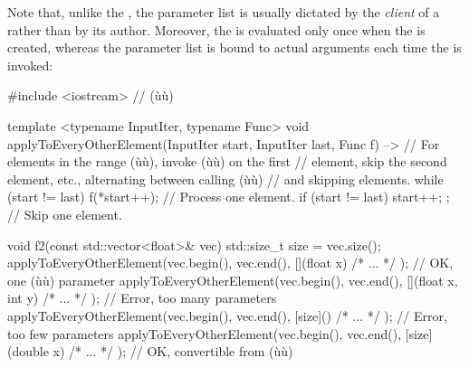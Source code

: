 Note that, unlike the , the parameter list is
usually dictated by the \emph{client} of a 
rather than by its author. Moreover, the  is
evaluated only once when the  is created, whereas the
parameter list is bound to actual arguments each time the  is invoked:

\begin{emcppslisting}
#include <iostream>  // (ù{}ù)

template <typename InputIter, typename Func>
void applyToEveryOtherElement(InputIter start, InputIter last, Func f) -->
    // For elements in the range (ù{\codeincomments{[start, last)}}ù), invoke (ù{}ù) on the first
    // element, skip the second element, etc., alternating between calling (ù{}ù)
    // and skipping elements.
{
    while (start != last)
    {
        f(*start++);                      // Process one element.
        if (start != last) { start++; };  // Skip one element.
    }
}

void f2(const std::vector<float>& vec)
{
    std::size_t size = vec.size();
    applyToEveryOtherElement(vec.begin(), vec.end(),
                [](float x){ /* ... */ });         // OK, one (ù{}ù) parameter
    applyToEveryOtherElement(vec.begin(), vec.end(),
                [](float x, int y){ /* ... */ });  // Error, too many parameters
    applyToEveryOtherElement(vec.begin(), vec.end(),
                [size](){ /* ... */ });            // Error, too few parameters
    applyToEveryOtherElement(vec.begin(), vec.end(),
                [size](double x){ /* ... */ });    // OK, convertible from (ù{}ù)
}
\end{emcppslisting}
    

